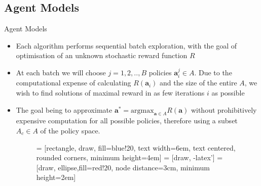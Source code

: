 \documentclass[10pt,usenames,dvipsnames]{beamer}
\begin{document}
\subsection{Agent Models}
\begin{frame}{Agent Models}
\begin{itemize}
\item Each algorithm performs sequential batch exploration, with the goal of optimisation of an unknown stochastic reward function $R$
\item At each batch we will choose $j=1,2,..,B$ policies $\bm{a}_i^j \in A$. Due to the computational expense of calculating $R(\bm{a}_i)$ and the size of the entire $A$, we wish to find solutions of maximal reward in as few iterations $i$ as possible
\item The goal being to approximate $\bm{a}^* = \mbox{argmax}_{\bm{a} \in A}R(\bm{a})$ without prohibitively expensive computation for all possible policies, therefore using a subset $A_c \in A$ of the policy space.

\begin{figure}[!t]
\centering
{} = [rectangle, draw, fill=blue!20, 
    text width=6em, text centered, rounded corners, minimum height=4em]
 = [draw, -latex']
 = [draw, ellipse,fill=red!20, node distance=3cm,
    minimum height=2em]
    
\label{fig_flow}
\end{figure}

\end{itemize}
  

\end{frame}
\end{document}
